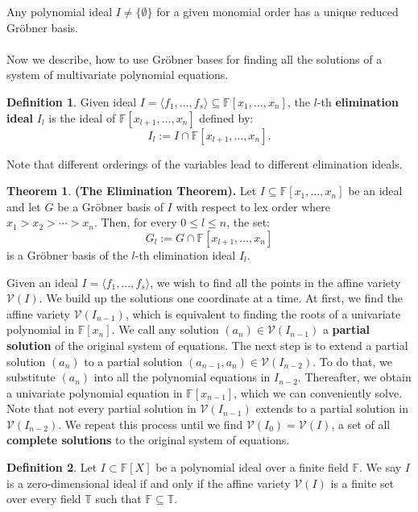 \documentclass[thesis=M,english]{FITthesis}[2012/10/20]
\theoremstyle{remark}
\theoremstyle{definition}
\newtheorem{DF}{Definition}[section]
\newtheorem{theorem}{Theorem}[section]
\begin{document}
\noindent Any polynomial ideal $I\neq \{\emptyset\}$ for a given monomial order has a unique reduced Gröbner basis. 
\\
\\
\noindent Now we describe, how to use Gröbner bases for finding all the solutions of a system of multivariate polynomial equations.
\begin{DF}
Given ideal $I = \langle f_1,\ldots,f_s\rangle \subseteq \mathbb{F}[x_1,\ldots,x_n]$, the $l$-th \textbf{elimination ideal} $I_l$ is the ideal of $\mathbb{F}[x_{l+1},\ldots,x_n]$ defined by:
$$
I_l := I \cap \mathbb{F}[x_{l+1},\ldots,x_n].
$$
\end{DF}
\noindent Note that different orderings of the variables lead to different elimination ideals.
\begin{theorem}
\textbf{(The Elimination Theorem).} Let $I \subseteq \mathbb{F}[x_1,\ldots,x_n]$ be an ideal and let $G$ be a Gröbner basis of $I$ with respect to lex order where $x_1 > x_2 > \cdots > x_n$. Then, for every $0\leq l \leq n$, the set:
$$
G_l := G \cap \mathbb{F}[x_{l+1},\ldots,x_n]
$$
is a Gröbner basis of the $l$-th elimination ideal $I_l$.
\end{theorem}
\vphantom{.}
\noindent Given an ideal $I = \langle f_1,\ldots,f_s \rangle$, we wish to find all the points in the affine variety $\mathcal{V}(I)$. We build up the solutions one coordinate at a time. At first, we find the affine variety $\mathcal{V}(I_{n-1})$, which is equivalent to finding the roots of a univariate polynomial in $\mathbb{F}[x_n]$. We call any solution $(a_n) \in \mathcal{V}(I_{n-1})$ a \textbf{partial solution} of the original system of equations. The next step is to extend a partial solution $(a_n)$ to a partial solution $(a_{n-1},a_n) \in \mathcal{V}(I_{n-2})$. To do that, we substitute $(a_n)$ into all the polynomial equations in $I_{n-2}$. Thereafter, we obtain a univariate polynomial equation in $\mathbb{F}[x_{n-1}]$, which we can conveniently solve. Note that not every partial solution in $\mathcal{V}(I_{n-1})$ extends to a partial solution in $\mathcal{V}(I_{n-2})$. We repeat this process until we find $\mathcal{V}(I_0) = \mathcal{V}(I)$, a set of all \textbf{complete solutions} to the original system of equations.
\begin{DF}
Let $I \subset \mathbb{F}[X]$ be a polynomial ideal over a finite field $\mathbb{F}$. We say $I$ is a zero-dimensional ideal if and only if the affine variety $\mathcal{V}(I)$ is a finite set over every field $\mathbb{T}$ such that $\mathbb{F} \subseteq\mathbb{T}$.
\end{DF}
\end{document}
